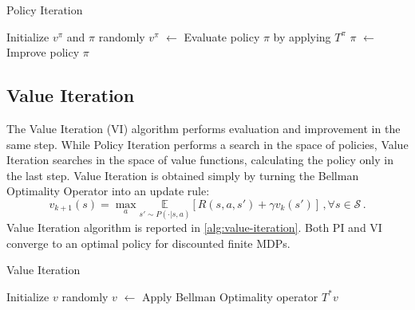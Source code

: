 \begin{algorithm}[tb]
  \caption{Policy Iteration
    \label{alg:policy-iteration}}
  \begin{algorithmic}[1]
  \Ensure{$\pi \approx \pi^*$}
  \State Initialize $v^\pi$ and $\pi$ randomly
  \Repeat
  \State $v^\pi$ $\leftarrow$ Evaluate policy $\pi$ by applying $T^{\pi}$
  \State $\pi$ $\leftarrow$  Improve policy $\pi$
   \\
  \end{algorithmic}
\end{algorithm}

\subsection{Value Iteration}  
The Value Iteration (VI) algorithm performs evaluation and improvement in the same step. While Policy Iteration performs a search in the space of policies, Value Iteration searches in the space of value functions, calculating the policy only in the last step.
Value Iteration is obtained simply by turning the Bellman Optimality Operator into an update rule:
\begin{equation}
		v_{k+1}(s) = \max_a \underset{s' \sim P(\cdot | s,a)}{\mathbb{E}} \left[ R(s,a,s') + \gamma v_{k}(s') \right] \, , \forall s \in \mathcal{S} \, .
\end{equation}
Value Iteration algorithm is reported in \cref{alg:value-iteration}. \newline
Both PI and VI converge to an optimal policy for discounted finite MDPs.

\begin{algorithm}[tb]
  \caption{Value Iteration
    \label{alg:value-iteration}}
  \begin{algorithmic}[1]
  \Ensure{$\pi \approx \pi^*$}
  \State Initialize $v$ randomly
  \Repeat
  \State $v$ $\leftarrow$ Apply Bellman Optimality operator $T^*v$
   \\
  \end{algorithmic}
\end{algorithm}
